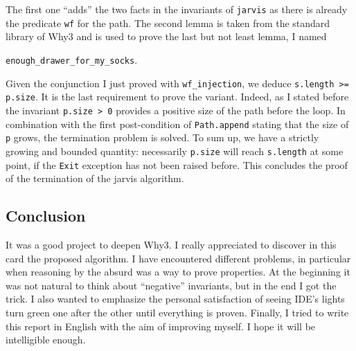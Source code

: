 \documentclass[a4paper, 11pt]{article}
\begin{document}
The first one “adds” the two facts in the invariants of \texttt{jarvis}
as there is already the predicate \texttt{wf} for the path.
The second lemma is taken from the standard library of Why3 and is used to prove
the last but not least lemma, I named \\
\centerline{\texttt{enough\_drawer\_for\_my\_socks}.}
Given the conjunction I just proved with \texttt{wf\_injection},
we deduce \texttt{s.length >= p.size}. It is the last requirement to prove the
variant. Indeed, as I stated before the invariant \texttt{p.size > 0} provides a
positive size of the path before the loop. In combination with the first post-condition
of \texttt{Path.append} stating that the size of \texttt{p} grows, the termination
problem is solved. To sum up, we have a strictly growing and bounded quantity:
necessarily \texttt{p.size} will reach \texttt{s.length} at some point,
if the \texttt{Exit} exception has not been raised before.
This concludes the proof of the termination of the jarvis algorithm.

\subsection*{Conclusion}

It was a good project to deepen Why3.
I really appreciated to discover in this card the proposed algorithm.
I have encountered different problems, in particular when reasoning by the
absurd was a way to prove properties.
At the beginning it was not natural to think about “negative” invariants,
but in the end I got the trick.
I also wanted to emphasize the personal satisfaction of seeing IDE's lights
turn green one after the other until everything is proven.
Finally, I tried to write this report in English with the aim of improving myself.
I hope it will be intelligible enough.
\end{document}
